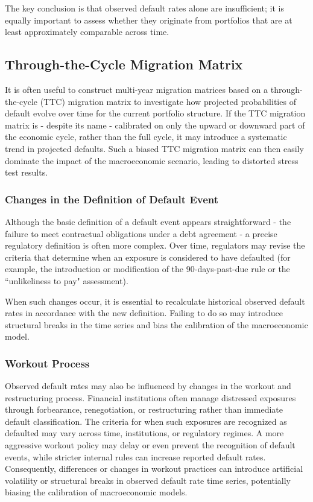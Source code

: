 \documentclass[11pt,a4paper]{article}
\begin{document}
The key conclusion is that observed default rates alone are insufficient; it is equally important to assess whether they originate from portfolios that are at least approximately comparable across time.

\subsection{Through-the-Cycle Migration Matrix}

It is often useful to construct multi-year migration matrices based on a through-the-cycle (TTC) migration matrix to investigate how projected probabilities of default evolve over time for the current portfolio structure. If the TTC migration matrix is - despite its name - calibrated on only the upward or downward part of the economic cycle, rather than the full cycle, it may introduce a systematic trend in projected defaults. Such a biased TTC migration matrix can then easily dominate the impact of the macroeconomic scenario, leading to distorted stress test results.

\subsubsection{Changes in the Definition of Default Event}

Although the basic definition of a default event appears straightforward - the failure to meet contractual obligations under a debt agreement - a precise regulatory definition is often more complex. Over time, regulators may revise the criteria that determine when an exposure is considered to have defaulted (for example, the introduction or modification of the 90-days-past-due rule or the ``unlikeliness to pay" assessment).

When such changes occur, it is essential to recalculate historical observed default rates in accordance with the new definition. Failing to do so may introduce structural breaks in the time series and bias the calibration of the macroeconomic model.

\subsubsection{Workout Process}

Observed default rates may also be influenced by changes in the workout and restructuring process. Financial institutions often manage distressed exposures through forbearance, renegotiation, or restructuring rather than immediate default classification. The criteria for when such exposures are recognized as defaulted may vary across time, institutions, or regulatory regimes. A more aggressive workout policy may delay or even prevent the recognition of default events, while stricter internal rules can increase reported default rates. Consequently, differences or changes in workout practices can introduce artificial volatility or structural breaks in observed default rate time series, potentially biasing the calibration of macroeconomic models.
\end{document}
